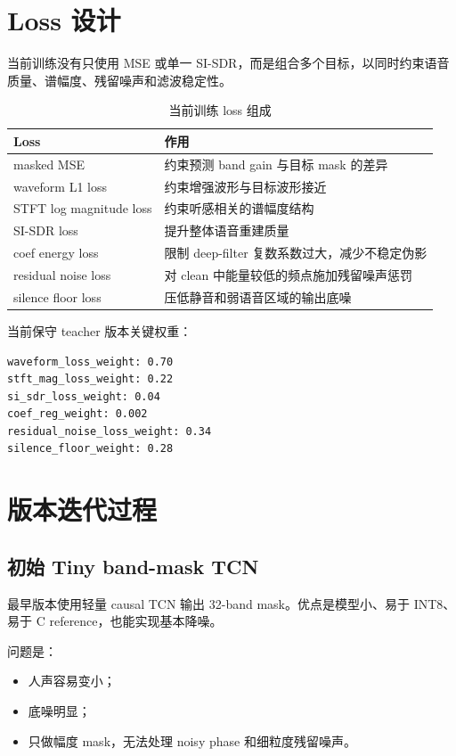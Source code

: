 \documentclass[UTF8,12pt,a4paper]{ctexart}
\begin{document}
\section{Loss 设计}

当前训练没有只使用 MSE 或单一 SI-SDR，而是组合多个目标，以同时约束语音质量、谱幅度、残留噪声和滤波稳定性。

\begin{table}[H]
\centering
\caption{当前训练 loss 组成}
\label{tab:loss}
\begin{tabularx}{\textwidth}{p{4.2cm}X}
\toprule
\textbf{Loss} & \textbf{作用} \\
\midrule
masked MSE & 约束预测 band gain 与目标 mask 的差异 \\
waveform L1 loss & 约束增强波形与目标波形接近 \\
STFT log magnitude loss & 约束听感相关的谱幅度结构 \\
SI-SDR loss & 提升整体语音重建质量 \\
coef energy loss & 限制 deep-filter 复数系数过大，减少不稳定伪影 \\
residual noise loss & 对 clean 中能量较低的频点施加残留噪声惩罚 \\
silence floor loss & 压低静音和弱语音区域的输出底噪 \\
\bottomrule
\end{tabularx}
\end{table}

当前保守 teacher 版本关键权重：

\begin{lstlisting}
waveform_loss_weight: 0.70
stft_mag_loss_weight: 0.22
si_sdr_loss_weight: 0.04
coef_reg_weight: 0.002
residual_noise_loss_weight: 0.34
silence_floor_weight: 0.28
\end{lstlisting}

\section{版本迭代过程}

\subsection{初始 Tiny band-mask TCN}

最早版本使用轻量 causal TCN 输出 32-band mask。优点是模型小、易于 INT8、易于 C reference，也能实现基本降噪。

问题是：

\begin{itemize}
  \item 人声容易变小；
  \item 底噪明显；
  \item 只做幅度 mask，无法处理 noisy phase 和细粒度残留噪声。
\end{itemize}
\end{document}
